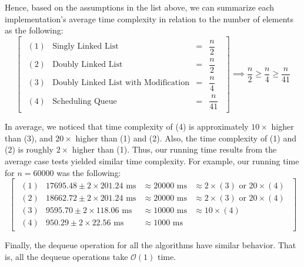 \documentclass[a4paper,11pt]{kth-mag}
\newcommand*{\skippara}{\par\vspace{\baselineskip} \noindent}
\begin{document}
\skippara Hence, based on the assumptions in the list above, we can summarize each implementation's average time complexity in relation to the number of elements as the following:
\begin{equation*}
    \begin{bmatrix*}
        \begin{array}{llll}
            (1) & \text{Singly Linked List} & = & \dfrac{n}{2} \\[3ex]
            (2) & \text{Doubly Linked List} & = & \dfrac{n}{2} \\[3ex]
            (3) & \text{Doubly Linked List with Modification} & = & \dfrac{n}{4} \\[3ex]
            (4) & \text{Scheduling Queue} & = & \dfrac{n}{41}
        \end{array}
    \end{bmatrix*}
    \implies \frac{n}{2} \ge \frac{n}{4} \ge \frac{n}{41}
\end{equation*}

\skippara In average, we noticed that time complexity of (4) is approximately $10\times$ higher than (3), and $20\times$ higher than (1) and (2).
Also, the time complexity of (1) and (2) is roughly $2\times$ higher than (1).
Thus, our running time results from the average case tests yielded similar time complexity.
For example, our running time for $n=60000$ was the following:
\begin{equation*}
    \begin{bmatrix*}
        \begin{array}{llllll}
            (1) & 17695.48 \pm 2\times 201.24 \text{ ms} & \approx 20000 \text{ ms}  & \approx 2\times(3)\text{ or } 20\times(4) \\[1ex]
            (2) & 18662.72 \pm 2\times 201.24 \text{ ms} & \approx 20000 \text{ ms}  & \approx 2\times(3)\text{ or } 20\times(4) \\[1ex]
            (3) & 9595.70 \pm 2\times 118.06 \text{ ms} & \approx 10000 \text{ ms} & \approx 10\times(4) \\[1ex]
            (4) & 950.29 \pm 2\times 22.56 \text{ ms} & \approx 1000 \text{ ms} &
        \end{array}
    \end{bmatrix*}
\end{equation*}

\skippara Finally, the dequeue operation for all the algorithms have similar behavior.
That is, all the dequeue operations take $\mathcal{O}(1)$ time.
\end{document}
